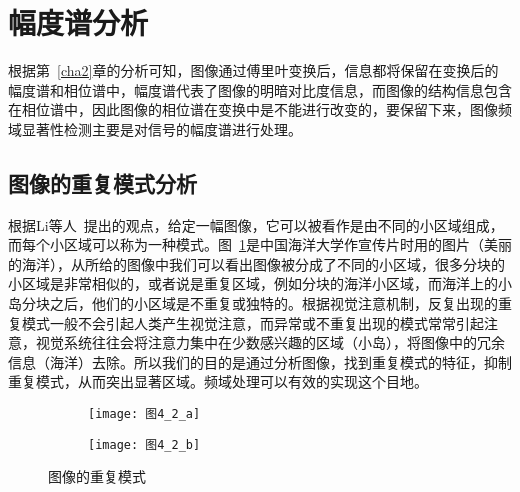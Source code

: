 \section{幅度谱分析}
\label{4_1}

根据第~\ref{cha2}章的分析可知，图像通过傅里叶变换后，信息都将保留在变换后的幅度谱和相位谱中，幅度谱代表了图像的明暗对比度信息，而图像的结构信息包含在相位谱中，因此图像的相位谱在变换中是不能进行改变的，要保留下来，图像频域显著性检测主要是对信号的幅度谱进行处理。

\subsection{图像的重复模式分析}
\label{4_1_1}

根据Li等人~\cite{LiJianTPAMI2013Scale}提出的观点，给定一幅图像，它可以被看作是由不同的小区域组成，而每个小区域可以称为一种模式。图~\ref{图4_2}是中国海洋大学作宣传片时用的图片（美丽的海洋），从所给的图像中我们可以看出图像被分成了不同的小区域，很多分块的小区域是非常相似的，或者说是重复区域，例如分块的海洋小区域，而海洋上的小岛分块之后，他们的小区域是不重复或独特的。根据视觉注意机制，反复出现的重复模式一般不会引起人类产生视觉注意，而异常或不重复出现的模式常常引起注意，视觉系统往往会将注意力集中在少数感兴趣的区域（小岛），将图像中的冗余信息（海洋）去除。所以我们的目的是通过分析图像，找到重复模式的特征，抑制重复模式，从而突出显著区域。频域处理可以有效的实现这个目地。
\begin{figure}[h]
  \centering%
  \begin{subfigure}{0.38\textwidth}
    \texttt{[image: 图4\_2\_a]}
    \caption{}
  \end{subfigure}
  \hspace{4em}%
  \begin{subfigure}{0.45\textwidth}
    \texttt{[image: 图4\_2\_b]}
    \caption{}
  \end{subfigure}
  \caption{图像的重复模式}
  \label{图4_2}
\end{figure}

